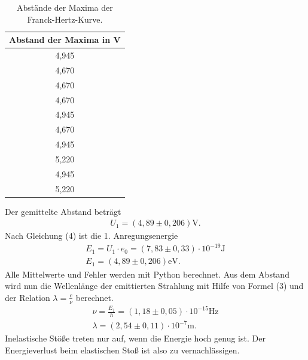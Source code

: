 \begin{table}[H]
  \centering
  \caption{Abstände der Maxima der Franck-Hertz-Kurve.}
  \label{tab:Parameter}
  \begin{tabular}{c }
    \toprule
     Abstand der Maxima in V \\
    \bottomrule
     4,945\\
     4,670\\
     4,670\\
     4,670\\
     4,945\\
    4,670\\
    4,945\\
    5,220\\
     4,945\\
    5,220\\
   \bottomrule
  \end{tabular}
\end{table}

\noindent Der gemittelte Abstand beträgt
\begin{align*}
U_1 = (4,89 \pm 0,206) \si{\V}.
\end{align*}
Nach Gleichung (4) ist die 1. Anregungsenergie
\begin{align*}
E_1 = U_1 \cdot e_0 = (7,83 \pm 0,33)\cdot 10^{-19} \si{\J} \\
E_1 = (4,89 \pm 0,206) \si{\eV}.
\end{align*}
Alle Mittelwerte und Fehler werden mit Python berechnet.
Aus dem Abstand wird nun die Wellenlänge der emittierten Strahlung mit Hilfe von Formel (3) und der Relation $\lambda = \frac{c}{\nu} $ berechnet.
\begin{align*}
\nu = \frac{E_1}{h} = (1,18 \pm 0,05)\cdot 10^{-15} \si{\Hz}\\
\lambda = (2,54 \pm 0,11)\cdot 10^{-7} \si{\m}.
\end{align*}
Inelastische Stöße treten nur auf, wenn die Energie hoch genug ist.
Der Energieverlust beim elastischen Stoß ist also zu vernachlässigen.

